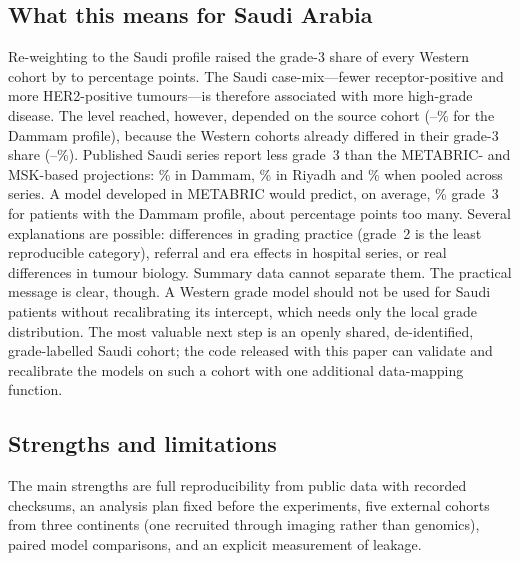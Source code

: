 \subsection{What this means for Saudi Arabia}
Re-weighting to the Saudi profile raised the grade-3 share of every Western cohort by \ShiftMin{} to
\ShiftMax{} percentage points. The Saudi case-mix---fewer receptor-positive and more HER2-positive
tumours---is therefore associated with more high-grade disease. The level reached, however,
depended on the source cohort (\RwGThreeKMin--\RwGThreeKMax\% for the Dammam profile), because the
Western cohorts already differed in their grade-3 share (\ObsGThreeMin--\ObsGThreeMax\%). Published
Saudi series report less grade~3 than the METABRIC- and MSK-based projections: \SaudiGThreeA\% in
Dammam, \SaudiGThreeB\% in Riyadh and \PoolGThree\% when pooled across \PoolK{} series. A model
developed in METABRIC would predict, on average, \PredGThreeMet\% grade~3 for patients with the
Dammam profile, about \OverPredPP{} percentage points too many. Several explanations are possible:
differences in grading practice (grade~2 is the least reproducible category), referral and era
effects in hospital series, or real differences in tumour biology. Summary data cannot separate them.
The practical message is clear, though. A Western grade model should not be used for Saudi patients
without recalibrating its intercept, which needs only the local grade distribution. The most valuable
next step is an openly shared, de-identified, grade-labelled Saudi cohort; the code released with this
paper can validate and recalibrate the models on such a cohort with one additional data-mapping
function.

\subsection{Strengths and limitations}
The main strengths are full reproducibility from public data with recorded checksums, an analysis plan
fixed before the experiments, five external cohorts from three continents (one recruited through
imaging rather than genomics), paired model comparisons, and an explicit measurement of leakage.

